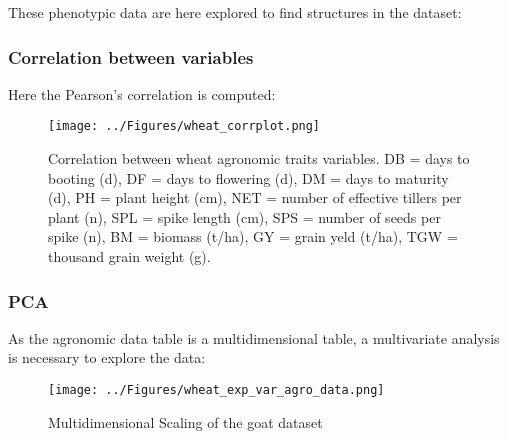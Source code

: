 \documentclass[a4paper,onecolumn,10pt]{article}
\begin{document}
These phenotypic data are here explored to find structures in the dataset:

\subsubsection{Correlation between variables}

Here the Pearson's correlation is computed:
\begin{figure*}
    \centering
    \texttt{[image: ../Figures/wheat\_corrplot.png]}
    \label{fig:wheat_corr}
    \caption{Correlation between wheat agronomic traits variables.
        DB = days to booting (d),
        DF = days to flowering (d),
        DM = days to maturity (d),
        PH = plant height (cm),
        NET = number of effective tillers per plant (n),
        SPL = spike length (cm),
        SPS = number of seeds per spike (n),
        BM = biomass (t/ha),
        GY = grain yeld (t/ha),
        TGW = thousand grain weight (g).}
\end{figure*}

\subsubsection{PCA}

As the agronomic data table is a multidimensional table, a multivariate analysis is necessary to explore the data:

\begin{figure*}
    \centering
    \texttt{[image: ../Figures/wheat\_exp\_var\_agro\_data.png]}
    \label{fig:wheat_}
    \caption{Multidimensional Scaling of the goat dataset}
\end{figure*}




\end{document}
